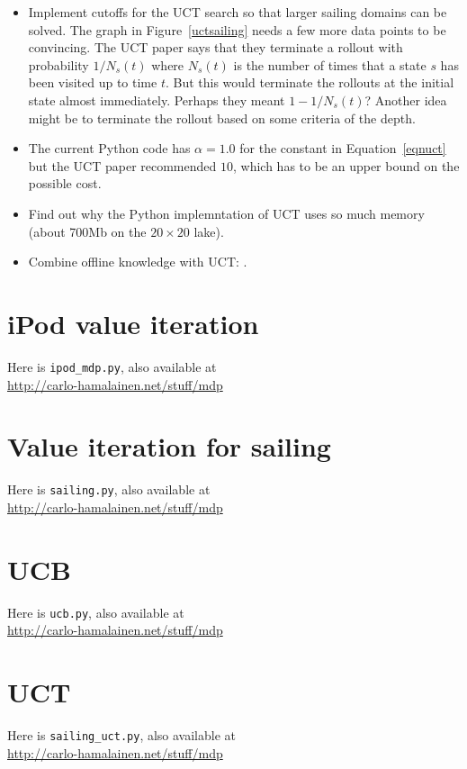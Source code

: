 \documentclass[10pt,amstags,fleqn]{article}
\theoremstyle{plain}
\theoremstyle{definition}
\theoremstyle{definition}
\begin{document}
\begin{itemize}

\item Implement cutoffs for the UCT search so that larger sailing
domains can be solved. The graph in Figure~\ref{uctsailing} needs
a few more data points to be convincing. The UCT paper says that
they terminate a rollout with probability $1/N_s(t)$ where $N_s(t)$
is the number of times that a state $s$ has been visited up to time
$t$. But this would terminate the rollouts at the initial state almost
immediately. Perhaps they meant $1 - 1/N_s(t)$? Another idea might
be to terminate the rollout based on some criteria of the depth.

\item The current Python code has $\alpha = 1.0$ for the constant in
Equation~\eqref{eqnuct} but the UCT paper recommended $10$, which has
to be an upper bound on the possible cost.

\item Find out why the Python implemntation of UCT uses so much memory
(about 700Mb on the $20 \times 20$ lake).

\item Combine offline knowledge with UCT: \cite{citeulike:2976742}.
\end{itemize}


\clearpage
\section{iPod value iteration}\label{secipodpython}

Here is \texttt{ipod\_mdp.py}, also available at\\
\url{http://carlo-hamalainen.net/stuff/mdp}



\clearpage
\section{Value iteration for sailing}\label{pythonsailing}

Here is \texttt{sailing.py}, also available at\\
\url{http://carlo-hamalainen.net/stuff/mdp}



\clearpage
\section{UCB}\label{pythonucb}

Here is \texttt{ucb.py}, also available at\\
\url{http://carlo-hamalainen.net/stuff/mdp}



\clearpage
\section{UCT}\label{pythonuct}

Here is \texttt{sailing\_uct.py}, also available at\\
\url{http://carlo-hamalainen.net/stuff/mdp}






\end{document}
